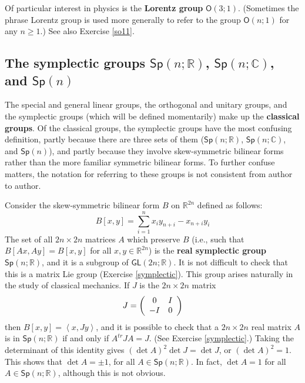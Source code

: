 \documentclass[12pt]{amsbook}
\theoremstyle{plain}
\numberwithin{equation}{chapter}
\numberwithin{theorem}{chapter}
\begin{document}
Of particular interest in physics is the \textbf{Lorentz group} $\mathsf{O}%
(3;1)$. (Sometimes the phrase Lorentz group is used more generally to refer to
the group $\mathsf{O}(n;1)$ for any $n\geq1$.) See also Exercise \ref{so11}.

\subsection{The symplectic groups $\mathsf{Sp}(n;\mathbb{R})$, $\mathsf{Sp}%
(n;\mathbb{C})$, and $\mathsf{Sp}(n)$}

The special and general linear groups, the orthogonal and unitary groups, and
the symplectic groups (which will be defined momentarily) make up the
\textbf{classical groups}. Of the classical groups, the symplectic groups have
the most confusing definition, partly because there are three sets of them
($\mathsf{Sp}(n;\mathbb{R})$, $\mathsf{Sp}(n;\mathbb{C})$, and $\mathsf{Sp}(n)
$), and partly because they involve skew-symmetric bilinear forms rather than
the more familiar symmetric bilinear forms. To further confuse matters, the
notation for referring to these groups is not consistent from author to author.

Consider the skew-symmetric bilinear form $B$ on $\mathbb{R}^{2n}$ defined as
follows:
\begin{equation}
B\left[  x,y\right]  =\sum_{i=1}^{n}x_{i}y_{n+i}-x_{n+i}y_{i}\label{skew.form}%
\end{equation}
The set of all $2n\times2n$ matrices $A$ which preserve $B$ (i.e., such that
$B\left[  Ax,Ay\right]  =B\left[  x,y\right]  $ for all $x,y\in\mathbb{R}^{2n}
$) is the \textbf{real symplectic group} $\mathsf{Sp}(n;\mathbb{R})$, and it
is a subgroup of $\mathsf{GL}(2n;\mathbb{R})$. It is not difficult to check
that this is a matrix Lie group (Exercise \ref{symplectic}). This group arises
naturally in the study of classical mechanics. If $J$ is the $2n\times2n$
matrix
\[
J=\left(
\begin{array}
[c]{cc}%
0 & I\\
-I & 0
\end{array}
\right)
\]
then $B\left[  x,y\right]  =\left\langle x,Jy\right\rangle $, and it is
possible to check that a $2n\times2n$ real matrix $A$ is in $\mathsf{Sp}%
(n;\mathbb{R})$ if and only if $A^{tr}JA=J$. (See Exercise \ref{symplectic}.)
Taking the determinant of this identity gives $\left(  \det A\right)  ^{2}\det
J=\det J$, or $\left(  \det A\right)  ^{2}=1$. This shows that $\det A=\pm1$,
for all $A\in\mathsf{Sp}(n;\mathbb{R})$. In fact, $\det A=1$ for all
$A\in\mathsf{Sp}(n;\mathbb{R})$, although this is not obvious.
\end{document}
